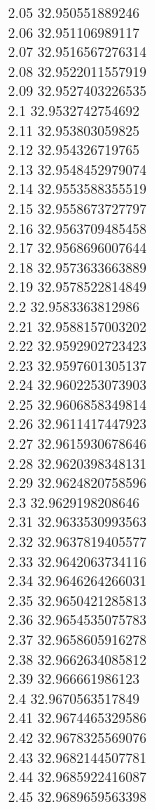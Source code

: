 {2.05	32.950551889246\\
2.06	32.951106989117\\
2.07	32.9516567276314\\
2.08	32.9522011557919\\
2.09	32.9527403226535\\
2.1	32.9532742754692\\
2.11	32.953803059825\\
2.12	32.954326719765\\
2.13	32.9548452979074\\
2.14	32.9553588355519\\
2.15	32.9558673727797\\
2.16	32.9563709485458\\
2.17	32.9568696007644\\
2.18	32.9573633663889\\
2.19	32.9578522814849\\
2.2	32.9583363812986\\
2.21	32.9588157003202\\
2.22	32.9592902723423\\
2.23	32.9597601305137\\
2.24	32.9602253073903\\
2.25	32.9606858349814\\
2.26	32.9611417447923\\
2.27	32.9615930678646\\
2.28	32.9620398348131\\
2.29	32.9624820758596\\
2.3	32.9629198208646\\
2.31	32.9633530993563\\
2.32	32.9637819405577\\
2.33	32.9642063734116\\
2.34	32.9646264266031\\
2.35	32.9650421285813\\
2.36	32.9654535075783\\
2.37	32.9658605916278\\
2.38	32.9662634085812\\
2.39	32.966661986123\\
2.4	32.9670563517849\\
2.41	32.9674465329586\\
2.42	32.9678325569076\\
2.43	32.9682144507781\\
2.44	32.9685922416087\\
2.45	32.9689659563398\\
}
